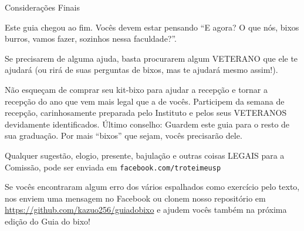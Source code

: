 \begin{secao}{Considerações Finais}

Este guia chegou ao fim. Vocês devem estar pensando ``E agora? O que nós, bixos
burros, vamos fazer, sozinhos nessa faculdade?''.

Se precisarem de alguma ajuda, basta procurarem algum VETERANO que ele te
ajudará (ou rirá de suas perguntas de bixos, mas te ajudará mesmo assim!).

Não esqueçam de comprar seu kit-bixo para ajudar a recepção e tornar a recepção
do ano que vem mais legal que a de vocês. Participem da semana de recepção,
carinhosamente preparada pelo Instituto e pelos seus VETERANOS devidamente
identificados. Último conselho: Guardem este guia para o resto de sua graduação.
Por mais ``bixos'' que sejam, vocês precisarão dele.

Qualquer sugestão, elogio, presente, bajulação e outras coisas LEGAIS para a
Comissão, pode ser enviada em {\tt facebook.com/troteimeusp}

Se vocês encontraram algum erro dos vários espalhados como exercício pelo texto,
nos enviem uma mensagem no Facebook ou clonem nosso repositório em
\url{https://github.com/kazuo256/guiadobixo} e ajudem vocês também na próxima
edição do Guia do bixo!

\end{secao}
